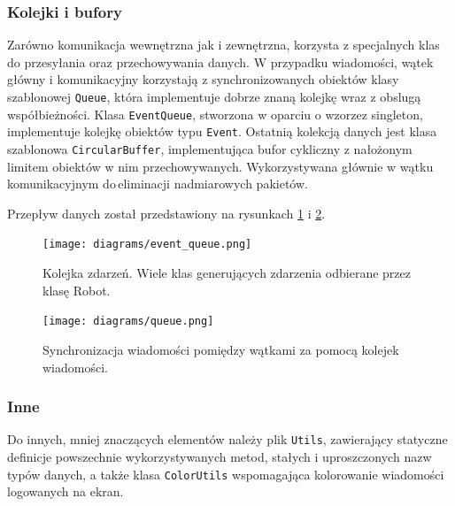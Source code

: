 \subsubsection{Kolejki i bufory}

Zarówno komunikacja wewnętrzna jak i zewnętrzna, korzysta z specjalnych klas do przesyłania oraz przechowywania danych. W przypadku wiadomości, wątek główny i komunikacyjny korzystają z synchronizowanych obiektów klasy szablonowej {\tt Queue}, która implementuje dobrze znaną kolejkę wraz z obslugą współbieżności. Klasa {\tt EventQueue}, stworzona w oparciu o wzorzez \gls{singleton}, implementuje kolejkę obiektów typu {\tt Event}. Ostatnią kolekcją danych jest klasa szablonowa {\tt CircularBuffer}, implementująca bufor cykliczny z nałożonym limitem obiektów w nim przechowywanych. Wykorzystywana głównie w wątku komunikacyjnym do\,eliminacji nadmiarowych pakietów.

Przepływ danych został przedstawiony na rysunkach \ref{fig:event_queue} i \ref{fig:queue}.

\begin{figure}[!ht]
    \centering
        \texttt{[image: diagrams/event\_queue.png]}
    \caption{Kolejka zdarzeń. Wiele klas generujących zdarzenia odbierane przez\,klasę Robot.\label{fig:event_queue}}
\end{figure}

\begin{figure}[!ht]
    \centering
        \texttt{[image: diagrams/queue.png]}
    \caption{Synchronizacja wiadomości pomiędzy wątkami za pomocą kolejek wiadomości.\label{fig:queue}}
\end{figure}

\subsubsection{Inne}

Do innych, mniej znaczących elementów należy plik {\tt Utils}, zawierający statyczne definicje powszechnie wykorzystywanych metod, stałych i uproszczonych nazw typów danych, a także klasa {\tt ColorUtils} wspomagająca kolorowanie wiadomości logowanych na ekran.
